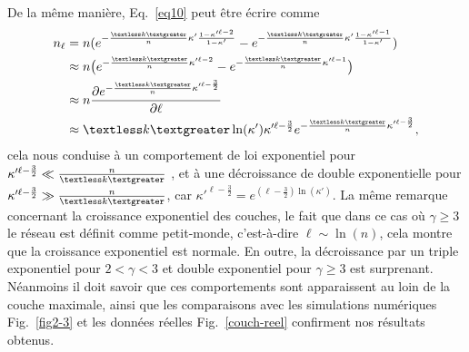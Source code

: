 De la même manière, Eq.~\eqref{eq10} peut être écrire comme
\begin{align}
n_{\ell}&= n(e^{-\frac{\textless k \textgreater}{n}\kappa'\frac{1-\kappa'^{\ell-2}}{1-\kappa'}}-e^{-\frac{\km}{n}\kappa'\frac{1-\kappa'^{\ell-1}}{1-\kappa'}})\nonumber\\
&\approx n\big(e^{-\frac{\km}{n}\kappa'^{\ell-2}}-e^{-\frac{\km}{n}\kappa'^{\ell-1}}\big)\nonumber\\
&\approx n\frac{\partial e^{-\frac{\km}{n}\kappa'^{\ell-\frac{3}{2}}}}{\partial \ell}\nonumber\\
&\approx\km\ln(\kappa')\kappa'^{\ell-\frac{3}{2}}e^{-\frac{\km}{n}\kappa'^{\ell-\frac{3}{2}}},
\end{align}
cela nous conduise à un comportement de loi exponentiel pour $\kappa'^{\ell-\frac{3}{2}} \ll \frac{n}{\km}$ , et à une décroissance de double exponentielle pour $\kappa'^{\ell-\frac{3}{2}} \gg \frac{n}{\km}$, car $\kappa'^{\ell-\frac{3}{2}}=e^{(\ell-\frac{3}{2})\ln(\kappa')}$. La même remarque  concernant la croissance exponentiel des couches, le fait que dans ce cas où $\gamma\geq3$ le réseau est définit comme petit-monde, c'est-à-dire $\ell\sim\ln(n)$, cela montre que la croissance exponentiel est normale. 
En outre, la décroissance par un triple exponentiel pour $2<\gamma<3$ et double exponentiel pour $\gamma\geqslant3$ est surprenant. Néanmoins il doit savoir que ces comportements sont apparaissent au loin de la couche maximale, ainsi que les comparaisons avec les simulations numériques Fig.~\ref{fig2-3}  et les données réelles Fig.~\ref{couch-reel} confirment nos résultats obtenus.

